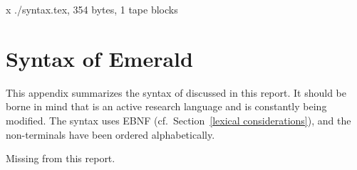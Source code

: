 x ./syntax.tex, 354 bytes, 1 tape blocks
\section{Syntax of Emerald}

This appendix summarizes the syntax of \emd{} discussed in this report. It
should be borne in mind that \emd{} is an active research language and is
constantly being modified.  The syntax uses EBNF (cf.~Section~\ref{lexical
considerations}), and the non-terminals have been ordered alphabetically.

Missing from this report.
